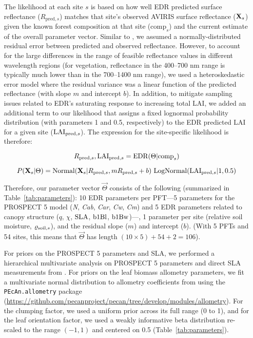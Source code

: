 The likelihood at each site $s$ is based on how well EDR predicted surface reflectance ($R_{\mathrm{pred}, s}$) matches that site's observed AVIRIS surface reflectance ($\mathbf{X}_{s}$)
given the known forest composition at that site ($\mathrm{comp}_{s}$) and the current estimate of the overall parameter vector.
Similar to \citet{shiklomanov2016quantifying}, we assumed a normally-distributed residual error between predicted and observed reflectance.
However, to account for the large differences in the range of feasible reflectance values in different wavelength regions
(for vegetation, reflectance in the 400--700 \unit{nm} range is typically much lower than in the 700--1400 \unit{nm} range),
we used a heteroskedastic error model where the residual variance was a linear function of the predicted reflectance (with slope $m$ and intercept $b$).
In addition, to mitigate sampling issues related to EDR's saturating response to increasing total LAI, we added an additional term to our likelihood that assigns a fixed lognormal probability distribution (with parameters 1 and 0.5, respectively) to the EDR predicted LAI for a given site ($\mathrm{LAI}_{\mathrm{pred}, s}$).
The expression for the site-specific likelihood is therefore:

\begin{equation}
  R_{\mathrm{pred}, s}, \mathrm{LAI}_{\mathrm{pred}, s} = \mathrm{EDR}(\relax{\Theta} | \mathrm{comp}_{s})
\end{equation}

\begin{equation}
  P(\mathbf{X}_{s} | \relax{\Theta}) =
  \mathrm{Normal}(\mathbf{X}_{s} | R_{\mathrm{pred}, s}, m R_{\mathrm{pred}, s} + b) ~
  \mathrm{LogNormal}(\mathrm{LAI}_{\mathrm{pred}, s} | 1, 0.5)
\end{equation}

Therefore, our parameter vector $\vec{\Theta}$ consists of the following (summarized in Table~\ref{tab:parameters}):
10 EDR parameters per PFT---5 parameters for the PROSPECT 5 model (\emph{N}, \emph{Cab}, \emph{Car}, \emph{Cw}, \emph{Cm}) and 5 EDR parameters related to canopy structure ($q$, $\chi$, $\mathrm{SLA}$, $\mathrm{b1Bl}$, $\mathrm{b1Bw}$)---,
1 parameter per site (relative soil moisture, $\varrho_{\mathrm{soil}, s}$),
and the residual slope ($m$) and intercept ($b$).
(With 5 PFTs and 54 sites, this means that $\vec{\Theta}$ has length $(10 \times 5) + 54 + 2 = 106$).

For priors on the PROSPECT 5 parameters and SLA, we performed a hierarchical multivariate analysis \citep{shiklomanov2020does} on PROSPECT 5 parameters and direct SLA measurements from \citep[][Chapter 3]{shiklomanov_dissertation}.
For priors on the leaf biomass allometry parameters, we fit a multivariate normal distribution to allometry coefficients from \citet{jenkins2003nationalscale,jenkins2004comprehensive} using the \texttt{PEcAn.allometry} package (\url{https://github.com/pecanproject/pecan/tree/develop/modules/allometry}).
For the clumping factor, we used a uniform prior across its full range (0 to 1), and for the leaf orientation factor, we used a weakly informative beta distribution re-scaled to the range $(-1, 1)$ and centered on 0.5 (Table~\ref{tab:parameters}).

